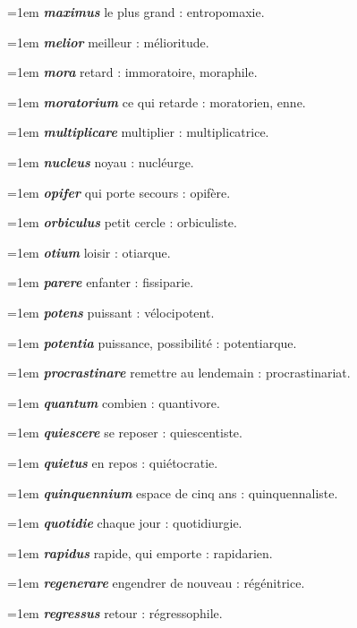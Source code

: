 \hangindent=1em \textbf{\textit{maximus}} le plus grand : entropomaxie.\par
\hangindent=1em \textbf{\textit{melior}} meilleur : mélioritude.\par
\hangindent=1em \textbf{\textit{mora}} retard : immoratoire, moraphile.\par
\hangindent=1em \textbf{\textit{moratorium}} ce qui retarde : moratorien, enne.\par
\hangindent=1em \textbf{\textit{multiplicare}} multiplier : multiplicatrice.\par
\hangindent=1em \textbf{\textit{nucleus}} noyau : nucléurge.\par
\hangindent=1em \textbf{\textit{opifer}} qui porte secours : opifère.\par
\hangindent=1em \textbf{\textit{orbiculus}} petit cercle : orbiculiste.\par
\hangindent=1em \textbf{\textit{otium}} loisir : otiarque.\par
\hangindent=1em \textbf{\textit{parere}} enfanter : fissiparie.\par
\hangindent=1em \textbf{\textit{potens}} puissant : vélocipotent.\par
\hangindent=1em \textbf{\textit{potentia}} puissance, possibilité : potentiarque.\par
\hangindent=1em \textbf{\textit{procrastinare}} remettre au lendemain : procrastinariat.\par
\hangindent=1em \textbf{\textit{quantum}} combien : quantivore.\par
\hangindent=1em \textbf{\textit{quiescere}} se reposer : quiescentiste.\par
\hangindent=1em \textbf{\textit{quietus}} en repos : quiétocratie.\par
\hangindent=1em \textbf{\textit{quinquennium}} espace de cinq ans : quinquennaliste.\par
\hangindent=1em \textbf{\textit{quotidie}} chaque jour : quotidiurgie.\par
\hangindent=1em \textbf{\textit{rapidus}} rapide, qui emporte : rapidarien.\par
\hangindent=1em \textbf{\textit{regenerare}} engendrer de nouveau : régénitrice.\par
\hangindent=1em \textbf{\textit{regressus}} retour : régressophile.\par
